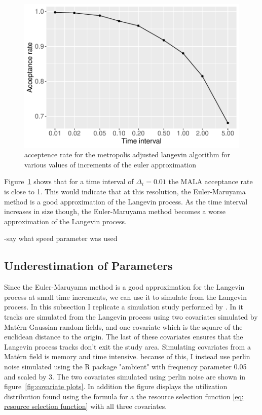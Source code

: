 \begin{figure}[H]
    \centering
    \includegraphics[width=\linewidth]{Images/example1/MALArates.pdf}
    \caption[MALA acceptance rates]{acceptence rate for the metropolis adjusted langevin algorithm for various values of increments of the euler approximation}
    \label{fig:MALA}
\end{figure}


Figure~\ref{fig:MALA} shows that for a time interval of $\Delta_t =0.01$ the MALA acceptance rate is close to 1. This would indicate that at this resolution, the Euler-Maruyama method is a good approximation of the Langevin process. As the time interval increases in size though, the Euler-Maruyama method becomes a worse approximation of the Langevin process.

-say what speed parameter was used

\subsection{Underestimation of Parameters}

Since the Euler-Maruyama method is a good approximation for the Langevin process at small time increments, we can use it to simulate from the Langevin process. In this subsection I replicate a simulation study performed by \parencite{michelot_langevin_2019}. In it tracks are simulated from the Langevin process using two covariates simulated by Matérn Gaussian random fields, and one covariate which is the square of the euclidean distance to the origin. The last of these covariates ensures that the Langevin process tracks don't exit the study area. Simulating covariates from a Matérn field is memory and time intensive. because of this, I instead use perlin noise simulated using the R package "ambient" with frequency parameter 0.05 and scaled by 3. The two covariates simulated using perlin noise are shown in figure~\ref{fig:covariate plots}. In addition the figure displays the utilization distribution found using the formula for a the resource selection function \eqref{eq: resource selection function} with all three covariates.


